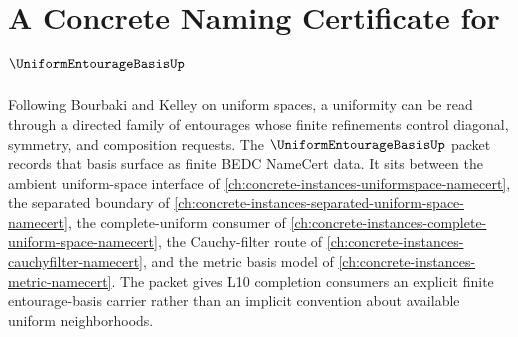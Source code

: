 \chapter{A Concrete Naming Certificate for $\UniformEntourageBasisUp$}
\label{ch:concrete-instances-uniform-entourage-basis-namecert}

Following Bourbaki and Kelley on uniform spaces, a uniformity can be read through a directed family of entourages whose finite refinements control diagonal, symmetry, and composition requests. The $\UniformEntourageBasisUp$ packet records that basis surface as finite BEDC NameCert data. It sits between the ambient uniform-space interface of \autoref{ch:concrete-instances-uniformspace-namecert}, the separated boundary of \autoref{ch:concrete-instances-separated-uniform-space-namecert}, the complete-uniform consumer of \autoref{ch:concrete-instances-complete-uniform-space-namecert}, the Cauchy-filter route of \autoref{ch:concrete-instances-cauchyfilter-namecert}, and the metric basis model of \autoref{ch:concrete-instances-metric-namecert}. The packet gives L10 completion consumers an explicit finite entourage-basis carrier rather than an implicit convention about available uniform neighborhoods.

